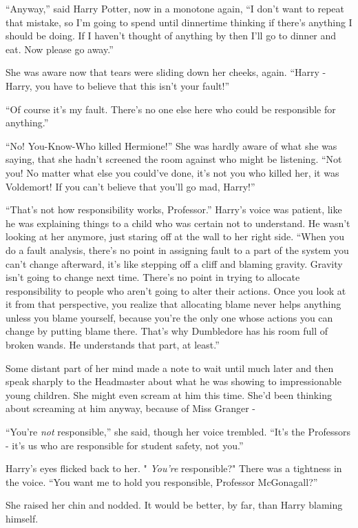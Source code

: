 ``Anyway,'' said Harry Potter, now in a monotone again, ``I don't want
to repeat that mistake, so I'm going to spend until dinnertime thinking
if there's anything I should be doing. If I haven't thought of anything
by then I'll go to dinner and eat. Now please go away.''

She was aware now that tears were sliding down her cheeks, again.
``Harry - Harry, you have to believe that this isn't your fault!''

``Of course it's my fault. There's no one else here who could be
responsible for anything.''

``No! You-Know-Who killed Hermione!'' She was hardly aware of what she
was saying, that she hadn't screened the room against who might be
listening. ``Not you! No matter what else you could've done, it's not
you who killed her, it was Voldemort! If you can't believe that you'll
go mad, Harry!''

``That's not how responsibility works, Professor.'' Harry's voice was
patient, like he was explaining things to a child who was certain not to
understand. He wasn't looking at her anymore, just staring off at the
wall to her right side. ``When you do a fault analysis, there's no point
in assigning fault to a part of the system you can't change afterward,
it's like stepping off a cliff and blaming gravity. Gravity isn't going
to change next time. There's no point in trying to allocate
responsibility to people who aren't going to alter their actions. Once
you look at it from that perspective, you realize that allocating blame
never helps anything unless you blame yourself, because you're the only
one whose actions you can change by putting blame there. That's why
Dumbledore has his room full of broken wands. He understands that part,
at least.''

Some distant part of her mind made a note to wait until much later and
then speak sharply to the Headmaster about what he was showing to
impressionable young children. She might even scream at him this time.
She'd been thinking about screaming at him anyway, because of Miss
Granger -

``You're \emph{not} responsible,'' she said, though her voice trembled.
``It's the Professors - it's us who are responsible for student safety,
not you.''

Harry's eyes flicked back to her. " \emph{You're} responsible?" There
was a tightness in the voice. ``You want me to hold you responsible,
Professor McGonagall?''

She raised her chin and nodded. It would be better, by far, than Harry
blaming himself.

